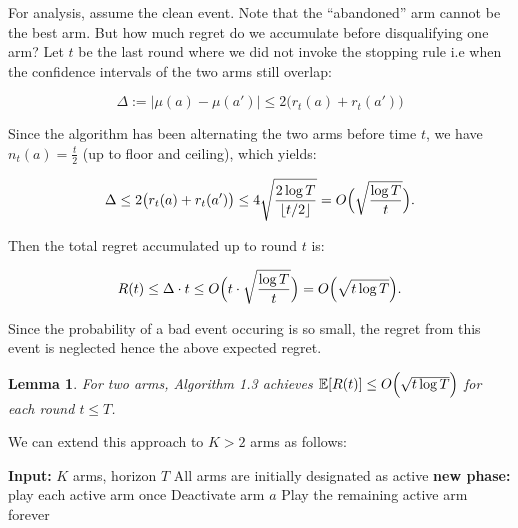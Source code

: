 \documentclass[12pt]{article}
\newtheorem{lemma}[theorem]{Lemma}
\begin{document}
\noindent For analysis, assume the clean event. Note that the “abandoned” arm cannot be the best arm. But how much regret do we accumulate before disqualifying one arm? Let $t$ be the last round where we did not invoke the stopping rule i.e when the confidence intervals of the two arms still overlap:

\[
\Delta := |\mu(a) - \mu(a')| \le 2 \bigl( r_t(a) + r_t(a') \bigr)
\]

\noindent  Since the algorithm has been alternating the two arms before time $t$, we have $n_t(a) = \frac{t}{2}$ (up to floor and ceiling), which yields:

\[
\Delta \le 2 \bigl( r_t(a) + r_t(a') \bigr)
\le 4 \sqrt{\frac{2 \log T}{\lfloor t/2 \rfloor}}
= O\Bigl(\sqrt{\frac{\log T}{t}}\Bigr).
\]

\noindent  Then the total regret accumulated up to round $t$ is:

\[
R(t) \le \Delta \cdot t 
\le O\Bigl(t \cdot \sqrt{\frac{\log T}{t}}\Bigr)
= O\Bigl(\sqrt{t \log T}\Bigr).
\]

\vspace{5mm}

\noindent Since the probability of a bad event occuring is so small, the regret from this event is neglected hence the above expected regret.

\vspace{5mm}

\begin{lemma}
For two arms, Algorithm 1.3 achieves $\mathbb{E}[R(t)] \le O\Bigl(\sqrt{t \log T}\Bigr)$ for each round $t \le T$. 
\end{lemma}


\noindent We can extend this approach to $K > 2$ arms as follows:

\begin{algorithm}[H]
\caption{Successive Elimination for $K$ Arms}
\begin{algorithmic}[1]
\STATE \textbf{Input:} $K$ arms, horizon $T$
\STATE All arms are initially designated as active
    \STATE \textbf{new phase:} play each active arm once
            \STATE Deactivate arm $a$ 
        \ENDIF
    \ENDFOR
\ENDWHILE
\STATE Play the remaining active arm forever
\end{algorithmic}
\end{algorithm}
\end{document}
